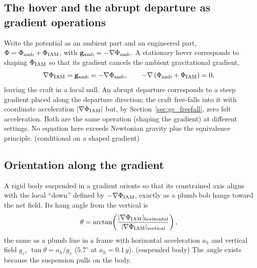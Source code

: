 \subsection{The hover and the abrupt departure as gradient operations}
Write the potential as an ambient part and an engineered part, $\Phi=\Phi_{\rm amb}+\Phi_{\rm IAM}$, with $\mathbf g_{\rm amb}=-\nabla\Phi_{\rm amb}$.
A stationary hover corresponds to shaping $\Phi_{\rm IAM}$ so that its gradient cancels the ambient gravitational gradient,
\begin{equation}
\nabla\Phi_{\rm IAM}=\mathbf g_{\rm amb}=-\nabla\Phi_{\rm amb},\qquad -\nabla\left(\Phi_{\rm amb}+\Phi_{\rm IAM}\right)=0 ,
\label{eq:ge_hover}
\end{equation}
leaving the craft in a local null. \derived{} An abrupt departure corresponds to a steep gradient placed along the departure direction; the craft
free-falls into it with coordinate acceleration $|\nabla\Phi_{\rm IAM}|$ but, by Section~\ref{sec:ge_freefall}, zero felt acceleration. Both are the
same operation (shaping the gradient) at different settings. No equation here exceeds Newtonian gravity plus the equivalence principle. \derived{}
(conditional on a shaped gradient)

\subsection{Orientation along the gradient}\label{sec:ge_orient}
A rigid body suspended in a gradient orients so that its constrained axis aligns with the local ``down'' defined by $-\nabla\Phi_{\rm IAM}$, exactly as
a plumb bob hangs toward the net field. Its hang angle from the vertical is
\begin{equation}
\theta=\arctan\!\left(\frac{|\nabla\Phi_{\rm IAM}|_{\rm horizontal}}{|\nabla\Phi_{\rm IAM}|_{\rm vertical}}\right),
\label{eq:ge_plumb}
\end{equation}
the same as a plumb line in a frame with horizontal acceleration $a_h$ and vertical field $g_v$, $\tan\theta=a_h/g_v$ ($5.7^\circ$ at $a_h=0.1\,g$).
\derived{} (suspended body) The angle exists because the suspension pulls on the body.

